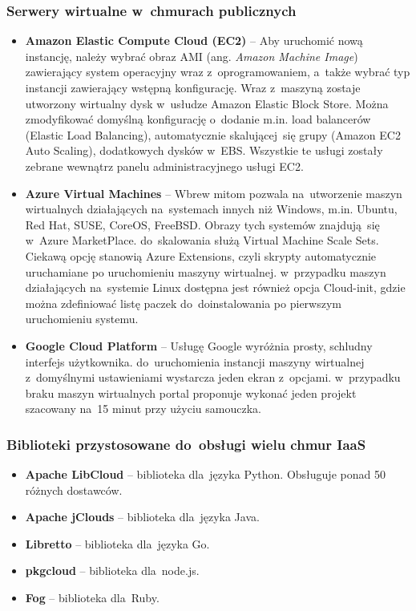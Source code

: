 \documentclass[12pt,a4paper,twoside,titlepage,openright]{book}
\begin{document}
\subsubsection*{Serwery wirtualne w~chmurach publicznych}
\begin{itemize}
\item \textbf{Amazon Elastic Compute Cloud (EC2)} -- Aby uruchomić nową instancję, należy wybrać obraz AMI (ang. \textit{Amazon Machine Image}) zawierający system operacyjny wraz z~oprogramowaniem, a~także wybrać typ instancji zawierający wstępną konfigurację. Wraz z~maszyną zostaje utworzony wirtualny dysk w~usłudze Amazon Elastic Block Store. Można zmodyfikować domyślną konfigurację o~dodanie m.in. load balancerów (Elastic Load Balancing), automatycznie skalującej~się grupy (Amazon EC2 Auto Scaling), dodatkowych dysków w~EBS. Wszystkie te usługi zostały zebrane wewnątrz panelu administracyjnego usługi EC2.
\item \textbf{Azure Virtual Machines} -- Wbrew mitom pozwala na~utworzenie maszyn wirtualnych działających na~systemach innych niż Windows, m.in. Ubuntu, Red Hat, SUSE, CoreOS, FreeBSD. Obrazy tych systemów znajdują~się w~Azure MarketPlace. do~skalowania służą Virtual Machine Scale Sets. Ciekawą opcję stanowią Azure Extensions, czyli skrypty automatycznie uruchamiane po uruchomieniu maszyny wirtualnej. w~przypadku maszyn działających na~systemie Linux dostępna jest również opcja Cloud-init, gdzie można zdefiniować listę paczek do~doinstalowania po pierwszym uruchomieniu systemu. 
\item \textbf{Google Cloud Platform} -- Usługę Google wyróżnia prosty, schludny interfejs użytkownika. do~uruchomienia instancji maszyny wirtualnej z~domyślnymi ustawieniami wystarcza jeden ekran z~opcjami. w~przypadku braku maszyn wirtualnych portal proponuje wykonać jeden projekt szacowany na~15 minut przy użyciu samouczka.
\end{itemize}

\subsubsection{Biblioteki przystosowane do~obsługi wielu chmur IaaS}
\begin{itemize}
\item \textbf{Apache LibCloud} -- biblioteka dla~języka Python. Obsługuje ponad 50 różnych dostawców.
\item \textbf{Apache jClouds} -- biblioteka dla~języka Java. 
\item \textbf{Libretto} -- biblioteka dla~języka Go.
\item \textbf{pkgcloud} -- biblioteka dla~node.js.
\item \textbf{Fog} -- biblioteka dla~Ruby.
\end{itemize}
\end{document}
